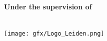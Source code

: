 \begin{titlepage}
\begin{addmargin}[-1cm]{-3cm}
\begin{center}
		
		\vspace{1cm}
        \myDegree \\
        

        \vspace{1cm}
         \textbf{Under the supervision of}\\ \medskip
        \myProf\\ \medskip
        
        \vfill
        \texttt{[image: gfx/Logo\_Leiden.png]} \\ \bigskip 
        \vspace{0.05cm}
        \myDepartment \\                            
        \myFaculty \\
        \myTime


        \vfill                      

    \end{center}  
  \end{addmargin}       
\end{titlepage}   
